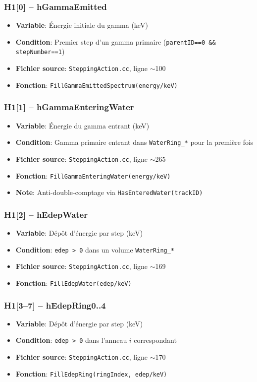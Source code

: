 \documentclass[11pt,a4paper]{article}
\begin{document}
\subsubsection{H1[0] -- hGammaEmitted}
\begin{itemize}
    \item \textbf{Variable}: Énergie initiale du gamma (keV)
    \item \textbf{Condition}: Premier step d'un gamma primaire (\texttt{parentID==0 \&\& stepNumber==1})
    \item \textbf{Fichier source}: \texttt{SteppingAction.cc}, ligne $\sim$100
    \item \textbf{Fonction}: \texttt{FillGammaEmittedSpectrum(energy/keV)}
\end{itemize}

\subsubsection{H1[1] -- hGammaEnteringWater}
\begin{itemize}
    \item \textbf{Variable}: Énergie du gamma entrant (keV)
    \item \textbf{Condition}: Gamma primaire entrant dans \texttt{WaterRing\_*} pour la première fois
    \item \textbf{Fichier source}: \texttt{SteppingAction.cc}, ligne $\sim$265
    \item \textbf{Fonction}: \texttt{FillGammaEnteringWater(energy/keV)}
    \item \textbf{Note}: Anti-double-comptage via \texttt{HasEnteredWater(trackID)}
\end{itemize}

\subsubsection{H1[2] -- hEdepWater}
\begin{itemize}
    \item \textbf{Variable}: Dépôt d'énergie par step (keV)
    \item \textbf{Condition}: \texttt{edep > 0} dans un volume \texttt{WaterRing\_*}
    \item \textbf{Fichier source}: \texttt{SteppingAction.cc}, ligne $\sim$169
    \item \textbf{Fonction}: \texttt{FillEdepWater(edep/keV)}
\end{itemize}

\subsubsection{H1[3--7] -- hEdepRing0..4}
\begin{itemize}
    \item \textbf{Variable}: Dépôt d'énergie par step (keV)
    \item \textbf{Condition}: \texttt{edep > 0} dans l'anneau $i$ correspondant
    \item \textbf{Fichier source}: \texttt{SteppingAction.cc}, ligne $\sim$170
    \item \textbf{Fonction}: \texttt{FillEdepRing(ringIndex, edep/keV)}
\end{itemize}
\end{document}
